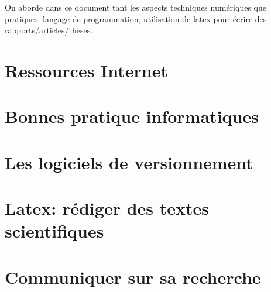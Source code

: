 \documentclass[a4paper,10pt]{book_ad}
\begin{document}
On aborde dans ce document tant les aspects techniques numériques que pratiques:
langage de programmation, utilisation de latex pour écrire des rapports/articles/thèses.



\tableofcontents 
\newpage

\dominitoc


\chapter{Ressources Internet}
\minitoc



\chapter{Bonnes pratique informatiques}
\minitoc


\chapter{Les logiciels de versionnement}
\minitoc



\chapter{Latex: rédiger des textes scientifiques}
\minitoc



\chapter{Communiquer sur sa recherche}
\minitoc

\end{document}
